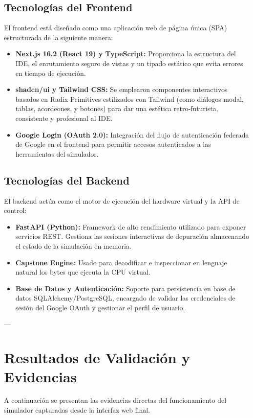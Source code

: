 \documentclass[12pt,letterpaper]{article}
\begin{document}
\subsection{Tecnologías del Frontend}
El frontend está diseñado como una aplicación web de página única (SPA) estructurada de la siguiente manera:
\begin{itemize}
    \item \textbf{Next.js 16.2 (React 19) y TypeScript:} Proporciona la estructura del IDE, el enrutamiento seguro de vistas y un tipado estático que evita errores en tiempo de ejecución.
    \item \textbf{shadcn/ui y Tailwind CSS:} Se emplearon componentes interactivos basados en Radix Primitives estilizados con Tailwind (como diálogos modal, tablas, acordeones, y botones) para dar una estética retro-futurista, consistente y profesional al IDE.
    \item \textbf{Google Login (OAuth 2.0):} Integración del flujo de autenticación federada de Google en el frontend para permitir accesos autenticados a las herramientas del simulador.
\end{itemize}

\subsection{Tecnologías del Backend}
El backend actúa como el motor de ejecución del hardware virtual y la API de control:
\begin{itemize}
    \item \textbf{FastAPI (Python):} Framework de alto rendimiento utilizado para exponer servicios REST. Gestiona las sesiones interactivas de depuración almacenando el estado de la simulación en memoria.
    \item \textbf{Capstone Engine:} Usado para decodificar e inspeccionar en lenguaje natural los bytes que ejecuta la CPU virtual.
    \item \textbf{Base de Datos y Autenticación:} Soporte para persistencia en base de datos SQLAlchemy/PostgreSQL, encargado de validar las credenciales de sesión del Google OAuth y gestionar el perfil de usuario.
\end{itemize}

---

\section{Resultados de Validación y Evidencias}
A continuación se presentan las evidencias directas del funcionamiento del simulador capturadas desde la interfaz web final.
\end{document}
